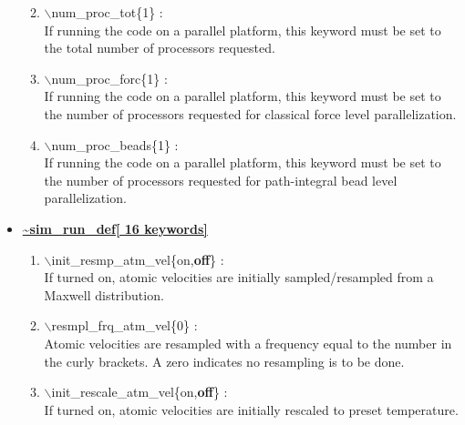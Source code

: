 \begin{itemize}
\begin{enumerate}
 \vspace{0.15in} \Large
 \item   $\backslash$num\_proc\_tot\{1\} : \\
     \large
     If running the code on a parallel platform, this keyword must be set
     to the total number of processors requested.


 \vspace{0.15in} \Large
 \item   $\backslash$num\_proc\_forc\{1\} : \\
     \large
     If running the code on a parallel platform, this keyword must be set
     to the number of processors requested for classical force level 
     parallelization.


 \vspace{0.15in} \Large
 \item   $\backslash$num\_proc\_beads\{1\} : \\
     \large
     If running the code on a parallel platform, this keyword must be set
     to the number of processors requested for path-integral bead level 
     parallelization.

\end{enumerate}

\clearpage
\huge
\item[] \underline{\bf \~{}sim\_run\_def[ 16 keywords]}
\begin{enumerate}

 \vspace{0.15in} \Large
 \item   $\backslash$init\_resmp\_atm\_vel\{on,{\bf off}\} : \\
     \large
     If turned on, atomic velocities are initially sampled/resampled from a 
     Maxwell distribution.


 \vspace{0.15in} \Large
 \item   $\backslash$resmpl\_frq\_atm\_vel\{0\} : \\
     \large
     Atomic velocities are resampled with a frequency equal to the number 
     in the curly brackets.  A zero indicates no resampling is to be done.


 \vspace{0.15in} \Large
 \item   $\backslash$init\_rescale\_atm\_vel\{on,{\bf off}\} : \\
    \large
    If turned on, atomic velocities are initially rescaled to preset 
    temperature.


\end{enumerate}
\end{itemize}
